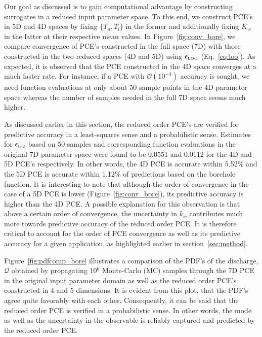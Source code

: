 Our goal as discussed is to gain computational advantage by constructing surrogates in a 
reduced input parameter space. To this end, we construct PCE's in 5D and 4D spaces by
fixing $\{T_u,T_l\}$ in the former and additionally fixing $K_w$ in the latter at their respective
mean values. In Figure~\ref{fig:conv_bore}, we compare convergence of PCE's constructed
in the full space (7D) with those constructed in the two reduced spaces (4D and 5D) using
$\epsilon_{\mbox{\tiny{LOO}}}$ (Eq.~\ref{eq:loo}). As expected, it is observed that the PCE
constructed in the 4D space converges at a much faster rate. For instance, if a PCE with
$\mathcal{O}(10^{-4})$ accuracy is sought, we need function evaluations at only about
50 sample points in the 4D parameter space whereas the number of samples needed in the full 
7D space seems much higher. 

As discussed earlier in this section, the reduced order PCE's are verified for predictive accuracy in 
a least-squares sense and a probabilistic sense. Estimates for $\epsilon_{\mbox{\tiny{L-2}}}$
based on 50 samples and corresponding function evaluations in the original 7D parameter space
were found to be 0.0551 and 0.0112 for the 4D and 5D PCE's respectively. In other words, the 4D
PCE is accurate within 5.52$\%$ and the 5D PCE is accurate within 1.12$\%$ of predictions based on
the borehole function. It is interesting to note that although the order of convergence in the case of a 5D
PCE is lower (Figure~\ref{fig:conv_bore}), its predictive accuracy is higher than the 4D PCE. A possible
explanation for this observation is that above a certain order of convergence, the uncertainty in $k_w$ 
contributes much more towards predictive accuracy of the reduced order PCE. It is therefore critical
to account for the order of PCE convergence as well as its predictive accuracy for a given application,
as highlighted earlier in section~\ref{sec:method}. 

Figure~\ref{fig:pdfcomp_bore} illustrates a comparison of the PDF's of the discharge, $\mathcal{Q}$
obtained by propagating 10$^6$ Monte-Carlo (MC) samples through the 7D PCE in the
original input parameter domain as well as the reduced order PCE's constructed in 4 and 5 dimensions. 
It is evident from this plot, that the PDF's agree quite favorably with each other. Consequently, it can
be said that the reduced order PCE is verified in a probabilistic sense. In other words, the mode as
well as the uncertainty in the observable is reliably captured and predicted by the reduced order PCE. 
 
